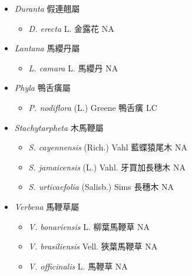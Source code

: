 
  \begin{itemize}
 \item[] \textit{Duranta} 假連翹屬
                                
  \begin{itemize}
        \item[] \textit{D. erecta} L.  金露花   NA
  \end{itemize}
 \item[] \textit{Lantana} 馬纓丹屬
                                
  \begin{itemize}
        \item[] \textit{L. camara} L.  馬纓丹   NA
  \end{itemize}
 \item[] \textit{Phyla} 鴨舌癀屬
                                
  \begin{itemize}
        \item[] \textit{P. nodiflora} (L.) Greene  鴨舌癀   LC
  \end{itemize}
 \item[] \textit{Stachytarpheta} 木馬鞭屬
                                
  \begin{itemize}
        \item[] \textit{S. cayennensis} (Rich.) Vahl  藍蝶猿尾木   NA
        \item[] \textit{S. jamaicensis} (L.) Vahl.  牙買加長穗木   NA
        \item[] \textit{S. urticaefolia} (Salisb.) Sims  長穗木   NA
  \end{itemize}
 \item[] \textit{Verbena} 馬鞭草屬
                                
  \begin{itemize}
        \item[] \textit{V. bonariensis} L.  柳葉馬鞭草   NA
        \item[] \textit{V. brasiliensis} Vell.  狹葉馬鞭草   NA
        \item[] \textit{V. officinalis} L.  馬鞭草   NA
  \end{itemize}
  \end{itemize}
